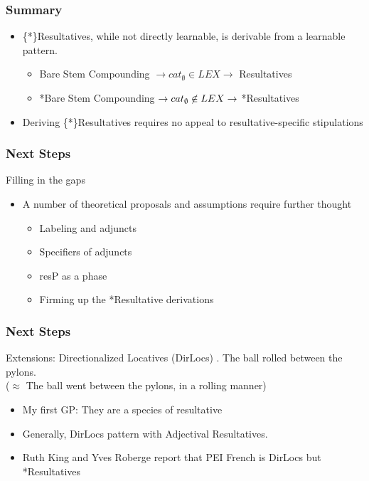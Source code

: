 \documentclass[Proposal]{subfiles}
\begin{document}
\begin{frame}
  \frametitle{Summary}
  \begin{itemize}[<+->]
    \item \{*\}Resultatives, while not directly learnable, is derivable from a learnable pattern.
      \begin{itemize}
	\item \checkmark Bare Stem Compounding $\rightarrow cat_\emptyset \in LEX \rightarrow$ \checkmark Resultatives
	\item *Bare Stem Compounding $\rightarrow cat_\emptyset \centernot\in LEX \rightarrow$ *Resultatives
      \end{itemize}
    \item Deriving \{*\}Resultatives requires no appeal to resultative-specific stipulations
  \end{itemize}
\end{frame}
\begin{frame}
  \frametitle{Next Steps}

  \begin{block}
    {Filling in the gaps}
    \begin{itemize}[<+->]
      \item A number of theoretical proposals and assumptions require further thought
	\begin{itemize}
	  \item Labeling and adjuncts
	  \item Specifiers of adjuncts
	  \item resP as a phase
	  \item Firming up the *Resultative derivations
	\end{itemize}
    \end{itemize}
  \end{block}
\end{frame}
\begin{frame}
  \frametitle{Next Steps}
  \begin{block}
    {Extensions: Directionalized Locatives (DirLocs)}
    \ex. {\rm The ball rolled between the pylons.}\\
    ($\approx$ The ball went between the pylons, in a rolling manner)

    \pause
    \begin{itemize}[<+->]
      \item My first GP: They are a species of resultative
      \item Generally, DirLocs pattern with Adjectival Resultatives.
      \item Ruth King and Yves Roberge \parencite[p.c. to][]{rooryck1996prepositions} report that PEI French is \checkmark DirLocs but *Resultatives
    \end{itemize}
  \end{block}
\end{frame}
\end{document}
